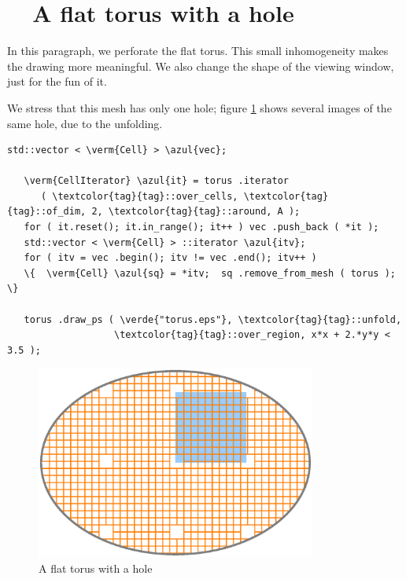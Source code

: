 \section{~~A flat torus with a hole}\label{\numb section 7.\numb parag 6}

In this paragraph, we perforate the flat torus.
This small inhomogeneity makes the drawing more meaningful.
We also change the shape of the viewing window, just for the fun of it.

We stress that this mesh has only one hole; figure \ref{\numb section 7.\numb fig 2}
shows several images of the same hole, due to the unfolding.

\begin{Verbatim}[commandchars=\\\{\},formatcom=\small\tt,frame=single,
   label=parag-\ref{\numb section 7.\numb parag 6}.cpp,rulecolor=\color{coment},
   baselinestretch=0.94,framesep=2mm                                            ]
   std::vector < \verm{Cell} > \azul{vec};

   \verm{CellIterator} \azul{it} = torus .iterator
      ( \textcolor{tag}{tag}::over_cells, \textcolor{tag}{tag}::of_dim, 2, \textcolor{tag}{tag}::around, A );
   for ( it.reset(); it.in_range(); it++ ) vec .push_back ( *it );
   std::vector < \verm{Cell} > ::iterator \azul{itv};
   for ( itv = vec .begin(); itv != vec .end(); itv++ )
   \{  \verm{Cell} \azul{sq} = *itv;  sq .remove_from_mesh ( torus );  \}

   torus .draw_ps ( \verde{"torus.eps"}, \textcolor{tag}{tag}::unfold,
                   \textcolor{tag}{tag}::over_region, x*x + 2.*y*y < 3.5 );
\end{Verbatim}

\begin{figure}[ht] \centering
  \includegraphics[width=92mm]{flat-torus-2.eps}
  \caption{A flat torus with a hole}
  \label{\numb section 7.\numb fig 2}
\end{figure}

